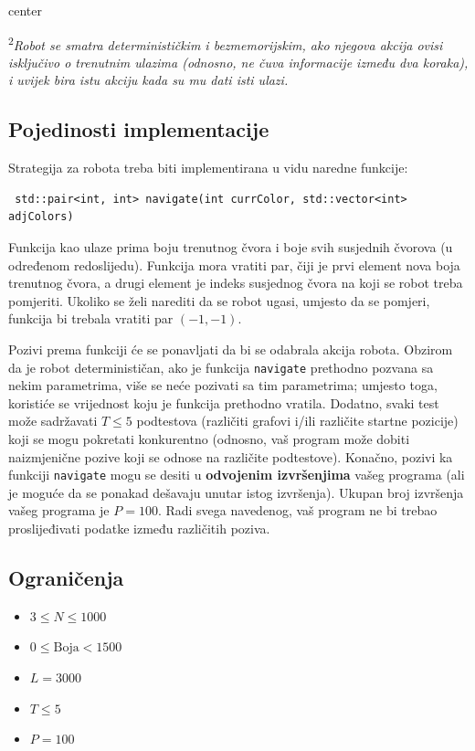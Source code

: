 \documentclass[12pt]{article}
\begin{document}
\begin{adjustbox}{center}
	
\end{adjustbox}

\textsuperscript{2}\textit{Robot se smatra determinističkim i bezmemorijskim, ako njegova akcija ovisi isključivo o trenutnim ulazima (odnosno, ne čuva informacije između dva koraka), i uvijek bira istu akciju kada su mu dati isti ulazi.}

\subsection{Pojedinosti implementacije}
Strategija za robota treba biti implementirana u vidu naredne funkcije:
\begin{lstlisting}
 std::pair<int, int> navigate(int currColor, std::vector<int> adjColors)
\end{lstlisting}

Funkcija kao ulaze prima boju trenutnog čvora i boje svih susjednih čvorova (u određenom redoslijedu). Funkcija mora vratiti par, čiji je prvi element nova boja trenutnog čvora, a drugi element je indeks susjednog čvora na koji se robot treba pomjeriti. Ukoliko se želi narediti da se robot ugasi, umjesto da se pomjeri, funkcija bi trebala vratiti par $(-1, -1)$.

Pozivi prema funkciji će se ponavljati da bi se odabrala akcija robota. Obzirom da je robot determinističan, ako je funkcija \texttt{navigate} prethodno pozvana sa nekim parametrima, više se neće pozivati sa tim parametrima; umjesto toga, koristiće se vrijednost koju je funkcija prethodno vratila. Dodatno, svaki test može sadržavati $T \leq 5$ podtestova (različiti grafovi i/ili različite startne pozicije) koji se mogu pokretati konkurentno (odnosno, vaš program može dobiti naizmjenične pozive koji se odnose na različite podtestove). Konačno, pozivi ka funkciji \texttt{navigate} mogu se desiti u \textbf{odvojenim izvršenjima} vašeg programa (ali je moguće da se ponakad dešavaju unutar istog izvršenja). Ukupan broj izvršenja vašeg programa je $P = 100$. Radi svega navedenog, vaš program ne bi trebao proslijeđivati podatke između različitih poziva.

\subsection{Ograničenja}

\begin{itemize}
\item $3 \leq N \leq 1000$
\item $0 \leq \mathrm{Boja} < 1500$
\item $L = 3000$
\item $T \leq 5$
\item $P = 100$
\end{itemize}
\end{document}
